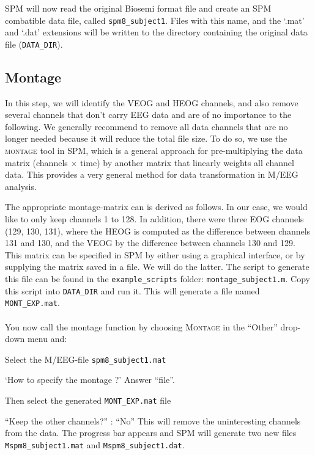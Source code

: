 SPM will now read the original Biosemi format file and create an SPM combatible data file, called \verb!spm8_subject1!. Files with this name, and the `.mat' and `.dat' extensions will be written to the directory containing the original data file (\texttt{DATA\_DIR}).

\subsection{Montage}

In this step, we will identify the VEOG and HEOG channels, and also remove several channels that don't carry EEG data and are of no importance to the following. We generally recommend to remove all data channels that are no longer needed because it will reduce the total file size. To do so, we use the \textsc{montage} tool in SPM, which is a general approach for pre-multiplying the data matrix (channels $\times$ time) by another matrix that linearly weights all channel data. This provides a very general method for data transformation in M/EEG analysis.

The appropriate montage-matrix can is derived as follows.
In our case, we would like to only keep channels 1 to 128. In addition, there were three EOG channels (129, 130, 131), where the HEOG is computed as the difference between channels 131 and 130, and the VEOG by the difference between channels 130 and 129. This matrix can be specified in SPM by either using a graphical interface, or by supplying the matrix saved in a file. We will do the latter. The script to generate this file can be found in the \texttt{example\_scripts} folder: \texttt{montage\_subject1.m}. Copy this script into \texttt{DATA\_DIR} and run it. This will generate a file named \texttt{MONT\_EXP.mat}.
\\
\\
You now call the montage function by choosing \textsc{Montage} in the ``Other'' drop-down menu and:
\bi
\item{Select the M/EEG-file \texttt{spm8\_subject1.mat}}
\item{`How to specify the montage ?' Answer ``file''.}
\item{Then select the generated \texttt{MONT\_EXP.mat} file}
\item{``Keep the other channels?'' : ``No''}
\ei
This will remove the uninteresting channels from the data. The progress bar appears and SPM will generate two new files \texttt{Mspm8\_subject1.mat} and \texttt{Mspm8\_subject1.dat}.

